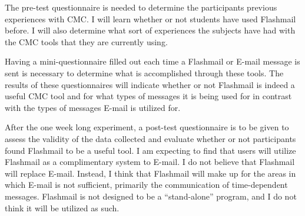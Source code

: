 The pre-test questionnaire is needed to determine the participants previous
experiences with CMC.  I will learn whether or not students have used
Flashmail before.  I will also determine what sort of experiences the
subjects have had with the CMC tools that they are currently using.

Having a mini-questionnaire filled out each time a Flashmail or
E-mail message is sent is necessary to determine what is accomplished
through these tools.  The results of these questionnaires will indicate
whether or not Flashmail is indeed a useful CMC tool and for what types of
messages it is being used for in contrast with the types of messages E-mail
is utilized for.

After the one week long experiment, a post-test questionnaire is to be given
to assess the validity of the data collected and evaluate whether or not
participants found Flashmail to be a useful tool.  I am expecting to find that
users will utilize Flashmail as a complimentary system to E-mail.  I do not
believe that Flashmail will replace E-mail.  Instead, I think that Flashmail
will make up for the areas in which E-mail is not sufficient, primarily the
communication of time-dependent messages.  Flashmail is not designed to be
a ``stand-alone'' program, and I do not think it will be utilized as such.

\appendix
\newpage
